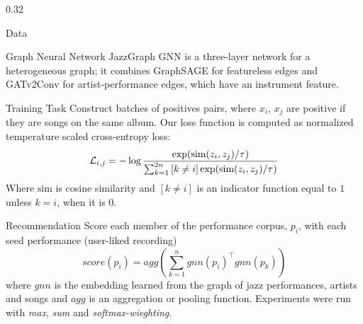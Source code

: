 \documentclass[final]{beamer}
\begin{document}
\begin{frame}[t]
\begin{columns}[t]
\begin{column}{0.32\textwidth}
\begin{block}{Data}
					
				\end{block}
				\begin{block}{Graph Neural Network}
					JazzGraph GNN is a three-layer network for a heterogeneous graph; it combines GraphSAGE for featureless edges and GATv2Conv for artist-performance edges, which have an instrument feature.
				\end{block}
				\begin{block}{Training Task}
					Construct batches of positives pairs, where $x_i$, $x_j$ are positive if they are songs on the same album.
					Our loss function is computed as normalized temperature scaled cross-entropy loss:
					$$
					\mathcal{L}_{i, j} = -\log\frac{
						\exp(\text{sim}(z_i, z_j)/\tau)
					}{
						\sum_{k=1}^{2n} {\small [k\neq i]}\exp(\text{sim}(z_i, z_j) / \tau)
					}
					$$
					Where $\text{sim}$ is cosine similarity and $[k\neq i]$ is an indicator function equal to $1$ unless $k=i$, when it is $0$.
					
				\end{block}
				\begin{block}{Recommendation}
					Score each member of the performance corpus, $p_i$, with each seed performance (user-liked recording)  $$
					score(p_i) =  agg(\sum_{k=1}^{n}gnn(p_i)^\intercal gnn(p_k))
					$$
					where $gnn$ is the embedding learned from the graph of jazz performances, artists and songs and $agg$ is an aggregation or pooling function. Experiments were run with \emph{max}, \emph{sum} and \emph{softmax-wieghting}.
					
				\end{block}
				
				
			\end{column}
			

\end{columns}
\end{frame}
\end{document}

